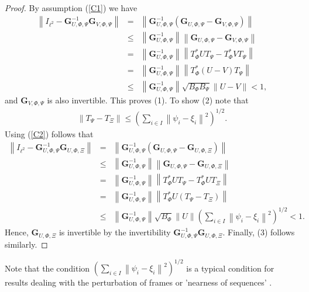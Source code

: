 \documentclass{birkjour}
\theoremstyle{definition}
\theoremstyle{remark}
\numberwithin{equation}{section}
\begin{document}
 \begin{proof}  By assumption (\ref{C1}) we have
 \begin{eqnarray*}
  \left\|I_{\ell^{2}}-\mathbf{G}_{U,\Phi,\Psi}^{-1}\mathbf{G}_{V,\Phi,\Psi}\right\|&=&\left\|\mathbf{G}_{U,\Phi,\Psi}^{-1}\left(\mathbf{G}_{U,\Phi,\Psi}-\mathbf{G}_{V,\Phi,\Psi}\right)\right\|\\
&\leq& \left\|\mathbf{G}_{U,\Phi,\Psi}^{-1}\right\| \left\|\mathbf{G}_{U,\Phi,\Psi}-\mathbf{G}_{V,\Phi,\Psi}\right\|\\
&=&\left\|\mathbf{G}_{U,\Phi,\Psi}^{-1}\right\|\left\|T_{\Phi}^{*}
 UT_{\Psi}-T_{\Phi}^{*}VT_{\Psi}\right\|\\
 &=&\left\|\mathbf{G}_{U,\Phi,\Psi}^{-1}\right\|\left\|T_{\Phi}^{*}(U-V)T_{\Psi}\right\|\\
 &\leq& \left\|\mathbf{G}_{U,\Phi,\Psi}^{-1}\right\|\sqrt{B_{\Phi}B_{\Psi}}\|U-V\|< 1,
 \end{eqnarray*}
 and  $\mathbf{G}_{V,\Phi,\Psi}$ is also invertible. This proves (1). To show (2) note that
 \begin{eqnarray}\label{Tsi}
 \left\|T_{\Psi}-T_{\Xi}\right\|\leq \left(\sum_{i\in I}\left\|\psi_{i}-\xi_{i}\right\|^{2}\right)^{1/2}.
 \end{eqnarray}
 Using (\ref{C2}) follows that
  \begin{eqnarray*}
  \left\|I_{\ell^{2}}-\mathbf{G}_{U,\Phi,\Psi}^{-1}\mathbf{G}_{U,\Phi,\Xi}\right\|&=&\left\|\mathbf{G}_{U,\Phi,\Psi}^{-1}\left(\mathbf{G}_{U,\Phi,\Psi}-\mathbf{G}_{U,\Phi,\Xi}\right)\right\|\\
 &\leq& \left\|\mathbf{G}_{U,\Phi,\Psi}^{-1}\right\|\left\|\mathbf{G}_{U,\Phi,\Psi}-\mathbf{G}_{U,\Phi,\Xi}\right\|\\
 &=&\left\|\mathbf{G}_{U,\Phi,\Psi}^{-1}\right\|
 \left\|T_{\Phi}^{*}UT_{\Psi}-T_{\Phi}^{*}UT_{\Xi}\right\|\\
 &=&\left\|\mathbf{G}_{U,\Phi,\Psi}^{-1}\right\|\left\|T_{\Phi}^{*}U(T_{\Psi}-T_{\Xi})\right\|\\
&\leq& \left\|\mathbf{G}_{U,\Phi,\Psi}^{-1}\right\|\sqrt{B_{\Phi}}\|U\|\left(\sum_{i\in I}\left\|\psi_{i}-\xi_{i}\right\|^{2}\right)^{1/2}
< 1.
 \end{eqnarray*}  Hence, $\mathbf{G}_{U,\Phi,\Xi}$ is invertible by the invertibility $\mathbf{G}_{U,\Phi,\Psi}^{-1}\mathbf{G}_{U,\Phi,\Xi}$.
Finally,
 (3) follows similarly.
  \end{proof}
 
Note that the condition $\left(\sum_{i\in I}\left\|\psi_{i}-\xi_{i}\right\|^{2}\right)^{1/2}$ is a typical condition for results dealing with  the perturbation of frames \cite{ole1n} or 'nearness of sequences' \cite{aria07,xxlframoper1}.
\end{document}
